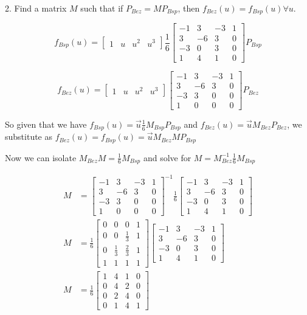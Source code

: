 \documentclass{letter}
\begin{document}
2. Find a matrix $M$ such that if $P_{Bez} = MP_{Bsp}$, then $f_{Bez}(u) = f_{Bsp}(u) \forall u$. 

$$f_{Bsp}(u) = 
\begin{bmatrix}
1 &
u &
u^2 &
u^3
\end{bmatrix}
\frac{1}{6}
\begin{bmatrix}
-1 & 3 & -3 & 1 \\
3 & -6 & 3 & 0 \\
-3 & 0 & 3 & 0 \\
1 & 4 & 1 & 0 
\end{bmatrix}
P_{Bsp}
$$

$$f_{Bez}(u) = 
\begin{bmatrix}
1 &
u &
u^2 &
u^3
\end{bmatrix}
\begin{bmatrix}
-1 & 3 & -3 & 1 \\
3 & -6 & 3 & 0 \\
-3 & 3 & 0 & 0 \\
1 & 0 & 0 & 0 
\end{bmatrix}
P_{Bez}
$$

So given that we have $f_{Bsp}(u) = \vec{u}\frac{1}{6}M_{Bsp}P_{Bsp}$ and $f_{Bez}(u) = \vec{u}M_{Bez}P_{Bez}$, we substitute as $f_{Bez}(u) = f_{Bsp}(u) = \vec{u}M_{Bez}MP_{Bsp}$

Now we can isolate $M_{Bez}M = \frac{1}{6}M_{Bsp}$ and solve for $M = M_{Bez}^{-1}\frac{1}{6}M_{Bsp}$

\begin{align*}
M &= 
\begin{bmatrix}
-1 & 3 & -3 & 1 \\
3 & -6 & 3 & 0 \\
-3 & 3 & 0 & 0 \\
1 & 0 & 0 & 0 
\end{bmatrix}^{-1}
\frac{1}{6}
\begin{bmatrix}
-1 & 3 & -3 & 1 \\
3 & -6 & 3 & 0 \\
-3 & 0 & 3 & 0 \\
1 & 4 & 1 & 0 
\end{bmatrix}
\\
M &= 
\frac{1}{6}
\begin{bmatrix}
0 & 0 & 0 & 1 \\
0 & 0 & \frac{1}{3} & 1 \\
0 & \frac{1}{3} & \frac{2}{3} & 1 \\
1 & 1 & 1 & 1
\end{bmatrix}
\begin{bmatrix}
-1 & 3 & -3 & 1 \\
3 & -6 & 3 & 0 \\
-3 & 0 & 3 & 0 \\
1 & 4 & 1 & 0 
\end{bmatrix}
\\
M &= 
\frac{1}{6}
\begin{bmatrix}
1 & 4 & 1 & 0 \\
0 & 4 & 2 & 0 \\
0 & 2 & 4 & 0 \\
0 & 1 & 4 & 1
\end{bmatrix}
\end{align*}
\end{document}
